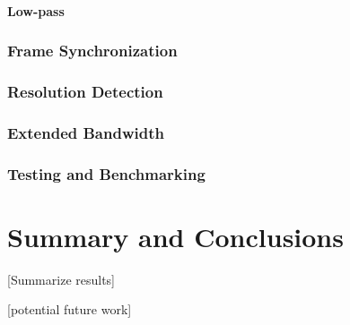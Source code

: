 \documentclass[a4paper,12pt,twoside,openright]{report}
\begin{document}
\subsubsection{Low-pass}

\subsection{Frame Synchronization}

\subsection{Resolution Detection}

\subsection{Extended Bandwidth}

\subsection{Testing and Benchmarking}

\chapter{Summary and Conclusions} 

[Summarize results]

[potential future work]

\appendix
\singlespacing

 
 
\end{document}

